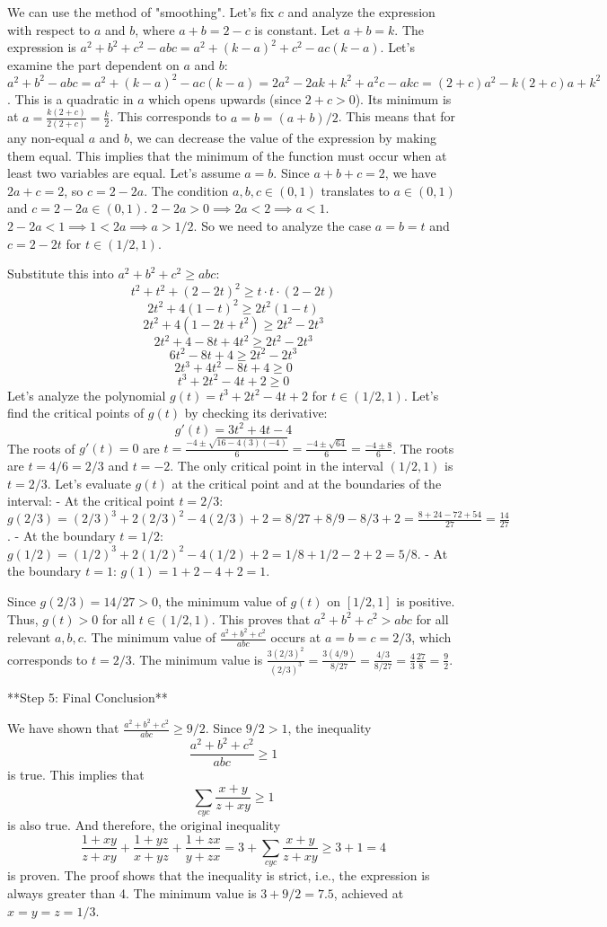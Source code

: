 We can use the method of "smoothing". Let's fix $c$ and analyze the expression with respect to $a$ and $b$, where $a+b=2-c$ is constant.
Let $a+b=k$. The expression is $a^2+b^2+c^2-abc = a^2+(k-a)^2+c^2-ac(k-a)$.
Let's examine the part dependent on $a$ and $b$: $a^2+b^2-abc = a^2+(k-a)^2-ac(k-a) = 2a^2-2ak+k^2+a^2c-akc = (2+c)a^2 - k(2+c)a + k^2$.
This is a quadratic in $a$ which opens upwards (since $2+c > 0$). Its minimum is at $a = \frac{k(2+c)}{2(2+c)} = \frac{k}{2}$.
This corresponds to $a=b=(a+b)/2$.
This means that for any non-equal $a$ and $b$, we can decrease the value of the expression by making them equal. This implies that the minimum of the function must occur when at least two variables are equal.
Let's assume $a=b$. Since $a+b+c=2$, we have $2a+c=2$, so $c=2-2a$.
The condition $a,b,c \in (0,1)$ translates to $a \in (0,1)$ and $c=2-2a \in (0,1)$.
$2-2a > 0 \implies 2a < 2 \implies a < 1$.
$2-2a < 1 \implies 1 < 2a \implies a > 1/2$.
So we need to analyze the case $a=b=t$ and $c=2-2t$ for $t \in (1/2, 1)$.

Substitute this into $a^2+b^2+c^2 \ge abc$:
$$ t^2+t^2+(2-2t)^2 \ge t \cdot t \cdot (2-2t) $$
$$ 2t^2 + 4(1-t)^2 \ge 2t^2(1-t) $$
$$ 2t^2 + 4(1-2t+t^2) \ge 2t^2-2t^3 $$
$$ 2t^2 + 4-8t+4t^2 \ge 2t^2-2t^3 $$
$$ 6t^2-8t+4 \ge 2t^2-2t^3 $$
$$ 2t^3+4t^2-8t+4 \ge 0 $$
$$ t^3+2t^2-4t+2 \ge 0 $$
Let's analyze the polynomial $g(t)=t^3+2t^2-4t+2$ for $t \in (1/2, 1)$.
Let's find the critical points of $g(t)$ by checking its derivative:
$$ g'(t) = 3t^2+4t-4 $$
The roots of $g'(t)=0$ are $t = \frac{-4 \pm \sqrt{16-4(3)(-4)}}{6} = \frac{-4 \pm \sqrt{64}}{6} = \frac{-4 \pm 8}{6}$.
The roots are $t = 4/6 = 2/3$ and $t = -2$.
The only critical point in the interval $(1/2, 1)$ is $t=2/3$.
Let's evaluate $g(t)$ at the critical point and at the boundaries of the interval:
- At the critical point $t=2/3$:
  $g(2/3) = (2/3)^3+2(2/3)^2-4(2/3)+2 = 8/27+8/9-8/3+2 = \frac{8+24-72+54}{27} = \frac{14}{27}$.
- At the boundary $t=1/2$:
  $g(1/2) = (1/2)^3+2(1/2)^2-4(1/2)+2 = 1/8+1/2-2+2 = 5/8$.
- At the boundary $t=1$:
  $g(1) = 1+2-4+2=1$.

Since $g(2/3) = 14/27 > 0$, the minimum value of $g(t)$ on $[1/2, 1]$ is positive. Thus, $g(t) > 0$ for all $t \in (1/2, 1)$.
This proves that $a^2+b^2+c^2 > abc$ for all relevant $a,b,c$.
The minimum value of $\frac{a^2+b^2+c^2}{abc}$ occurs at $a=b=c=2/3$, which corresponds to $t=2/3$.
The minimum value is $\frac{3(2/3)^2}{(2/3)^3} = \frac{3(4/9)}{8/27} = \frac{4/3}{8/27} = \frac{4}{3}\frac{27}{8} = \frac{9}{2}$.

**Step 5: Final Conclusion**

We have shown that $\frac{a^2+b^2+c^2}{abc} \ge 9/2$. Since $9/2 > 1$, the inequality
$$ \frac{a^2+b^2+c^2}{abc} \ge 1 $$
is true. This implies that
$$ \sum_{cyc} \frac{x+y}{z+xy} \ge 1 $$
is also true. And therefore, the original inequality
$$ \frac{1+xy}{z+xy} + \frac{1+yz}{x+yz} + \frac{1+zx}{y+zx} = 3 + \sum_{cyc} \frac{x+y}{z+xy} \ge 3+1 = 4 $$
is proven. The proof shows that the inequality is strict, i.e., the expression is always greater than 4. The minimum value is $3+9/2 = 7.5$, achieved at $x=y=z=1/3$.